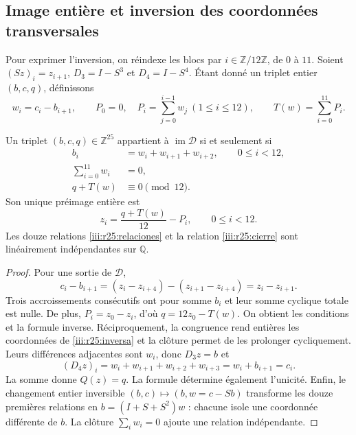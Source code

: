 \subsection{Image entière et inversion des coordonnées transversales}
\label{iii:r25:imagen-seccion}

Pour exprimer l’inversion, on réindexe les blocs par
$i\in\mathbb Z/12\mathbb Z$, de $0$ à $11$. Soient
$(Sz)_i=z_{i+1}$, $D_3=I-S^3$ et $D_4=I-S^4$.
Étant donné un triplet entier $(b,c,q)$, définissons
\begin{equation}
 w_i=c_i-b_{i+1},\qquad
 P_0=0,\quad P_i=\sum_{j=0}^{i-1}w_j\ (1\leq i\leq12),
 \qquad T(w)=\sum_{i=0}^{11}P_i.
 \label{iii:r25:incrementos}
\end{equation}

\begin{theorem}
\label{iii:r25:imagen}
Un triplet $(b,c,q)\in\mathbb Z^{25}$ appartient à
$\operatorname{im}\mathcal D$ si et seulement si
\begin{align}
 b_i&=w_i+w_{i+1}+w_{i+2},\qquad 0\leq i<12,
       \label{iii:r25:relaciones}\\
 \sum_{i=0}^{11}w_i&=0,\label{iii:r25:cierre}\\
 q+T(w)&\equiv0\pmod {12}.\label{iii:r25:congruencia}
\end{align}
Son unique préimage entière est
\begin{equation}
 z_i=\frac{q+T(w)}{12}-P_i,\qquad0\leq i<12.
 \label{iii:r25:inversa}
\end{equation}
Les douze relations \eqref{iii:r25:relaciones} et la relation
\eqref{iii:r25:cierre} sont linéairement indépendantes sur
$\mathbb Q$.
\end{theorem}
\begin{proof}
Pour une sortie de $\mathcal D$,
\[
 c_i-b_{i+1}
 =(z_i-z_{i+4})-(z_{i+1}-z_{i+4})=z_i-z_{i+1}.
\]
Trois accroissements consécutifs ont pour somme $b_i$ et leur somme cyclique
totale est nulle. De plus, $P_i=z_0-z_i$, d’où
$q=12z_0-T(w)$. On obtient les conditions et la formule inverse.
Réciproquement, la congruence rend entières les coordonnées de
\eqref{iii:r25:inversa} et la clôture permet de les prolonger
cycliquement. Leurs différences adjacentes sont $w_i$, donc $D_3z=b$
et
\[
 (D_4z)_i=w_i+w_{i+1}+w_{i+2}+w_{i+3}
 =w_i+b_{i+1}=c_i.
\]
La somme donne $Q(z)=q$. La formule détermine également l’unicité.
Enfin, le changement entier inversible
$(b,c)\mapsto(b,w=c-Sb)$ transforme les douze premières relations
en $b=(I+S+S^2)w$ : chacune isole une coordonnée différente de
$b$. La clôture $\sum_iw_i=0$ ajoute une relation indépendante.
\end{proof}

